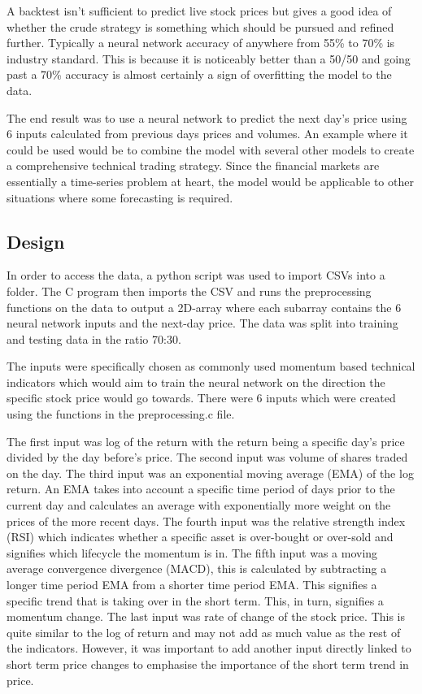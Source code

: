 \documentclass[11pt]{article}
\begin{document}
A backtest isn't sufficient to predict live stock prices but gives a good idea of whether the crude strategy is something which should be pursued and refined further. Typically a neural network accuracy of anywhere from 55\% to 70\% is industry standard. This is because it is noticeably better than a 50/50 and going past a 70\% accuracy is almost certainly a sign of overfitting the model to the data. 

The end result was to use a neural network to predict the next day's price using 6 inputs calculated from previous days prices and volumes. An example where it could be used would be to combine the model with several other models to create a comprehensive technical trading strategy. Since the financial markets are essentially a time-series problem at heart, the model would be applicable to other situations where some forecasting is required. 

\subsection{Design}
In order to access the data, a python script was used to import CSVs into a folder. The C program then imports the CSV and runs the preprocessing functions on the data to output a 2D-array where each subarray contains 
the 6 neural network inputs and the next-day price. The data was split into training and testing data in the ratio 70:30.

The inputs were specifically chosen as commonly used momentum based technical indicators which would aim to train the neural network on the direction the specific stock price would go towards. There were 6 inputs which were created using the functions in the preprocessing.c file. 

The first input was log of the return with the return being a specific day's price divided by the day before's price. The second input was volume of shares traded on the day. The third input was an exponential moving average (EMA) of the log return. An EMA takes into account a specific time period of days prior to the current day and calculates an average with exponentially more weight on the prices of the more recent days. The fourth input was the relative strength index (RSI) which indicates whether a specific asset is over-bought or over-sold and signifies which lifecycle the momentum is in. The fifth input was a moving average convergence divergence (MACD), this is calculated by subtracting a longer time period EMA from a shorter time period EMA. This signifies a specific trend that is taking over in the short term. This, in turn, signifies a momentum change. The last input was rate of change of the stock price. This is quite similar to the log of return and may not add as much value as the rest of the indicators. However, it was important to add another input directly linked to short term price changes to emphasise the importance of the short term trend in price.
\end{document}
